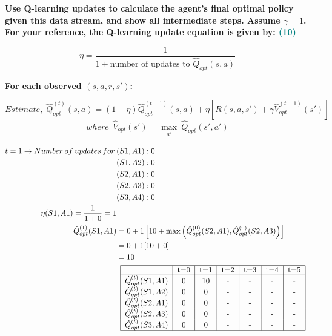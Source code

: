 \documentclass[a4paper]{article}
\begin{document}
\begin{sloppypar}
\begin{enumerate}[start=8,label=Q\arabic*,left=0pt]
    \textbf{Use Q-learning updates to calculate the agent’s final optimal policy given this data stream,
    and show all intermediate steps. Assume $\gamma = 1$. For your reference, the Q-learning update equation is given by: \hfill \textcolor{teal}{(10)}}
    
    \[ \eta = \frac{1}{1 + \text{number of updates to } \hat{Q}_{opt}(s, a)} \]

    \textbf{For each observed $(s, a, r, s')$:}

    \[ Estimate, \; \hat{Q}^{(t)}_{opt}(s, a) = (1 - \eta) \hat{Q}^{(t-1)}_{opt}(s, a) + \eta[R(s, a, s') + \gamma \hat{V}^{(t-1)}_{opt}(s')] \]
    \[ where \:\: \hat{V}_{opt}(s') = \max_{\substack{a'}} \ \hat{Q}_{opt}(s', a') \]

    \begin{align*}
        t = 1 \rightarrow Number \: of \: updates \: for \: &(S1, A1): 0 \\
        & (S1, A2): 0 \\
        & (S2, A1): 0 \\
        & (S2, A3): 0 \\
        & (S3, A4): 0 \\
        \eta (S1, A1) = \frac{1}{1 + 0} = 1 \\
        \hat{Q}^{(1)}_{opt}(S1, A1) &= 0 + 1 \left[ 10 + \max \left( \hat{Q}^{(0)}_{opt}(S2, A1), \hat{Q}^{(0)}_{opt}(S2, A3)  \right) \right] \\
        &= 0 + 1[10 + 0] \\
        &= 10 \\
        & \begin{array}{c}
            \begin{tabular}{|c|c|c|c|c|c|c|}
                \hline
                & t=0 & t=1 & t=2 & t=3 & t=4 & t=5 \\
                \hline
                $\hat{Q}^{(t)}_{opt}(S1, A1)$ & 0 & 10 & - & - & - & - \\ 
                $\hat{Q}^{(t)}_{opt}(S1, A2)$ & 0 & 0 & - & - & - & - \\ 
                $\hat{Q}^{(t)}_{opt}(S2, A1)$ & 0 & 0 & - & - & - & - \\ 
                $\hat{Q}^{(t)}_{opt}(S2, A3)$ & 0 & 0 & - & - & - & - \\ 
                $\hat{Q}^{(t)}_{opt}(S3, A4)$ & 0 & 0 & - & - & - & - \\ 
                \hline
            \end{tabular}
        \end{array} \\

\end{align*}
\end{enumerate}
\end{sloppypar}
\end{document}
